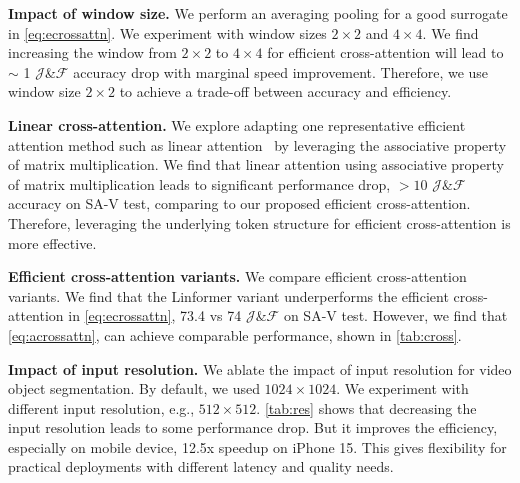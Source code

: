 \noindent \textbf{Impact of window size.} We perform an averaging pooling for a good surrogate in \cref{eq:ecrossattn}. We experiment with window sizes $2\times 2$ and $4 \times 4$. We find increasing the window from $2\times 2$ to $4\times 4$ for efficient cross-attention will lead to $\sim$ 1 $\mathcal{J}$\&$\mathcal{F}$ accuracy drop with marginal speed improvement. Therefore, we use window size $2\times 2$ to achieve a trade-off between accuracy and efficiency. 


\noindent \textbf{Linear cross-attention.} We explore adapting one representative efficient attention method such as linear attention~\citep{choromanski2020rethinking,cai2023efficientvit,you2023castling} by leveraging the associative property of matrix multiplication. We find that linear attention using associative property of matrix multiplication leads to significant performance drop, $>10$ $\mathcal{J}$\&$\mathcal{F}$ accuracy on SA-V test, comparing to our proposed efficient cross-attention. Therefore, leveraging the underlying token structure for efficient cross-attention is more effective. 


\noindent \textbf{Efficient cross-attention variants.} We compare efficient cross-attention variants. We find that the Linformer variant underperforms the efficient cross-attention in \cref{eq:ecrossattn}, 73.4 vs 74 $\mathcal{J}$\&$\mathcal{F}$ on SA-V test. However, we find that \cref{eq:acrossattn}, can achieve comparable performance, shown in \cref{tab:cross}. 


\noindent \textbf{Impact of input resolution.} We ablate the impact of input resolution for video object segmentation. By default, we used $1024\times 1024$. We experiment with different input resolution, e.g., $512\times 512$. \cref{tab:res} shows that decreasing the input resolution leads to some performance drop. But it improves the efficiency, especially on mobile device, 12.5x speedup on iPhone 15. This gives flexibility for practical deployments with different latency and quality needs.